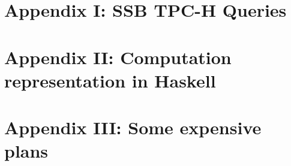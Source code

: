 \documentclass[fontsize=12pt,paper=letter,twosided,cleardoublepage=plain,final]{scrbook}
\begin{document}
\appendix
\chapter{Appendix I: SSB TPC-H Queries}
\label{chapter:appendix}


\chapter{Appendix II: Computation representation in Haskell}
\label{chapter:appendix2}


\chapter{Appendix III: Some expensive plans}
\label{chapter:appendix3}



\begin{spacing}{1}
\printbibliography
\end{spacing}

\backmatter
\end{document}
